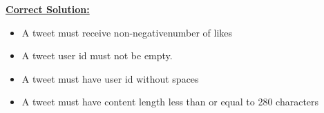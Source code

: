 \documentclass[12pt]{article}
\begin{document}
\begin{mdframed}
    \underline{\textbf{Correct Solution:}}

    \bigskip

    \begin{itemize}
        \item A tweet must receive \color{red}non-negative\color{black}\:number of likes
        \item \color{red}A tweet user id must not be empty.\color{black}
        \item A tweet must have user id without spaces
        \item \color{red} A tweet must have content length less than or equal to 280 characters\color{black}
    \end{itemize}

\end{mdframed}
\end{document}
